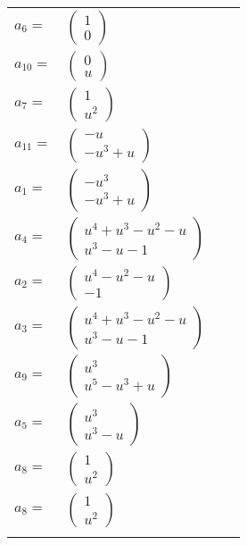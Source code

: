 \documentclass[1p]{elsarticle_modified}
\theoremstyle{definition}
\begin{document}
\begin{tabular}{m{7pt} m{180pt} m{7pt} m{180pt} }
\flushright $a_{6}=$&$\begin{pmatrix}1\\0\end{pmatrix}$ \\
\flushright $a_{10}=$&$\begin{pmatrix}0\\u\end{pmatrix}$ \\
\flushright $a_{7}=$&$\begin{pmatrix}1\\u^2\end{pmatrix}$ \\
\flushright $a_{11}=$&$\begin{pmatrix}- u\\- u^3+u\end{pmatrix}$ \\
\flushright $a_{1}=$&$\begin{pmatrix}- u^3\\- u^3+u\end{pmatrix}$ \\
\flushright $a_{4}=$&$\begin{pmatrix}u^4+u^3- u^2- u\\u^3- u-1\end{pmatrix}$ \\
\flushright $a_{2}=$&$\begin{pmatrix}u^4- u^2- u\\-1\end{pmatrix}$ \\
\flushright $a_{3}=$&$\begin{pmatrix}u^4+u^3- u^2- u\\u^3- u-1\end{pmatrix}$ \\
\flushright $a_{9}=$&$\begin{pmatrix}u^3\\u^5- u^3+u\end{pmatrix}$ \\
\flushright $a_{5}=$&$\begin{pmatrix}u^3\\u^3- u\end{pmatrix}$ \\
\flushright $a_{8}=$&$\begin{pmatrix}1\\u^2\end{pmatrix}$\\ \flushright $a_{8}=$&$\begin{pmatrix}1\\u^2\end{pmatrix}$\\&\end{tabular}
\end{document}
